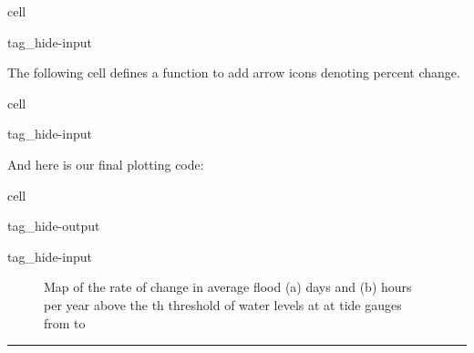 \documentclass[letterpaper,10pt,english]{jupyterBook}
\begin{document}
\begin{sphinxuseclass}{cell}
\begin{sphinxuseclass}{tag_hide-input}
\end{sphinxuseclass}
\end{sphinxuseclass}
\sphinxAtStartPar
The following cell defines a function to add arrow icons denoting percent change.

\begin{sphinxuseclass}{cell}
\begin{sphinxuseclass}{tag_hide-input}
\end{sphinxuseclass}
\end{sphinxuseclass}
\sphinxAtStartPar
And here is our final plotting code:

\begin{sphinxuseclass}{cell}
\begin{sphinxuseclass}{tag_hide-output}
\begin{sphinxuseclass}{tag_hide-input}
\end{sphinxuseclass}
\end{sphinxuseclass}
\end{sphinxuseclass}
\begin{figure}[htbp]
\centering
\capstart

\noindent{}
\caption{Map of the rate of change in average flood (a) days and (b) hours per year above the th threshold of water levels at at  tide gauges from  to }\label{\detokenize{notebooks/FloodFrequency:mag-fig}}\end{figure}


\bigskip\hrule\bigskip
\end{document}
